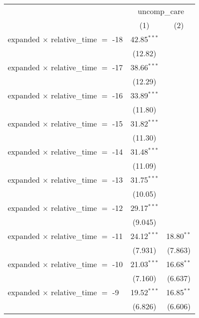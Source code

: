 
\begingroup
\centering
\tiny
\begin{tabular}{lcc}
   \toprule
    & \multicolumn{2}{c}{uncomp\_care}\\
                                              & (1)            & (2)\\  
   \midrule 
   expanded $\times$ relative\_time $=$ -18   & 42.85$^{***}$  &   \\   
                                              & (12.82)        &   \\   
   expanded $\times$ relative\_time $=$ -17   & 38.66$^{***}$  &   \\   
                                              & (12.29)        &   \\   
   expanded $\times$ relative\_time $=$ -16   & 33.89$^{***}$  &   \\   
                                              & (11.80)        &   \\   
   expanded $\times$ relative\_time $=$ -15   & 31.82$^{***}$  &   \\   
                                              & (11.30)        &   \\   
   expanded $\times$ relative\_time $=$ -14   & 31.48$^{***}$  &   \\   
                                              & (11.09)        &   \\   
   expanded $\times$ relative\_time $=$ -13   & 31.75$^{***}$  &   \\   
                                              & (10.05)        &   \\   
   expanded $\times$ relative\_time $=$ -12   & 29.17$^{***}$  &   \\   
                                              & (9.045)        &   \\   
   expanded $\times$ relative\_time $=$ -11   & 24.12$^{***}$  & 18.80$^{**}$\\   
                                              & (7.931)        & (7.863)\\   
   expanded $\times$ relative\_time $=$ -10   & 21.03$^{***}$  & 16.68$^{**}$\\   
                                              & (7.160)        & (6.637)\\   
   expanded $\times$ relative\_time $=$ -9    & 19.52$^{***}$  & 16.85$^{**}$\\   
                                              & (6.826)        & (6.606)\\   

\end{tabular}
